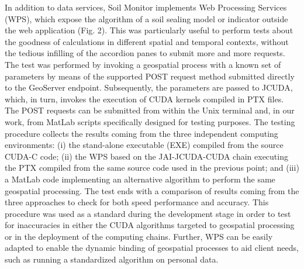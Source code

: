 \documentclass[APA,LATO1COL,doublespace]{WileyNJD-v2}
\begin{document}
In addition to data services, Soil Monitor implements Web Processing Services (WPS), which expose the algorithm of a soil sealing model or indicator outside the web application (Fig. 2). 
This was particularly useful to perform tests about the goodness of calculations in different spatial and temporal contexts, without the tedious infilling of the accordion panes to submit more and more requests. 
The test was performed by invoking a geospatial process with a known set of parameters by means of the supported POST request method submitted directly to the GeoServer endpoint. 
Subsequently, the parameters are passed to JCUDA, which, in turn, invokes the execution of CUDA kernels compiled in PTX files. 
The POST requests can be submitted from within the Unix terminal and, in our work, from MatLab scripts specifically designed for testing purposes. 
The testing procedure collects the results coming from the three independent computing environments: 
(i) the stand-alone executable (EXE) compiled from the source CUDA-C code; 
(ii) the WPS based on the JAI-JCUDA-CUDA chain executing the PTX compiled from the same source code used in the previous point; and 
(iii) a MatLab code implementing an alternative algorithm to perform the same geospatial processing. 
The test ends with a comparison of results coming from the three approaches to check for both speed performance and accuracy. 
This procedure was used as a standard during the development stage in order to test for inaccuracies in either the CUDA algorithms targeted to geospatial processing or in the deployment of the computing chains.
Further, WPS can be easily adapted to enable the dynamic binding of geospatial processes to aid client needs, such as running a standardized algorithm on personal data.
\end{document}
